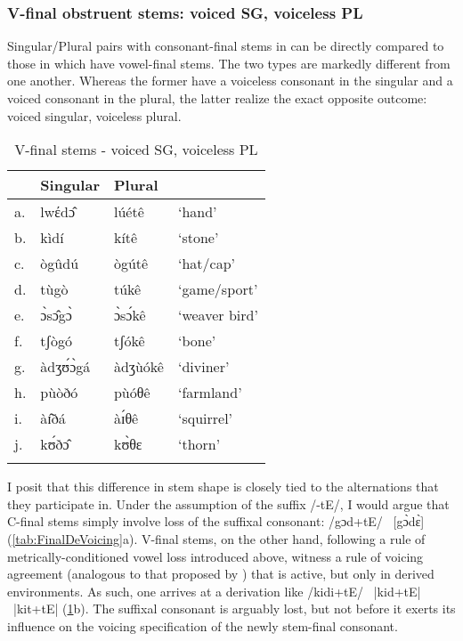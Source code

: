 \documentclass[output=paper,colorlinks,citecolor=brown]{langscibook}
\begin{document}
\subsubsection{V-final obstruent stems: voiced SG, voiceless PL}
\begin{sloppypar}
Singular/Plural pairs with consonant-final stems in  can be directly compared to those in  which have vowel-final stems. The two types are markedly different from one another. Whereas the former have a voiceless consonant in the singular and a voiced consonant in the plural, the latter realize the exact opposite outcome: voiced singular, voiceless plural.
\end{sloppypar}

\begin{table}
\caption{V-final stems - voiced SG, voiceless PL}
\label{tab:V-FinalDevoicing}
 \begin{tabular}{llll}
  \lsptoprule
& Singular & Plural &  \\
\midrule
a.	&lwέdɔ̂ &	lúétê	&`hand' \\
b.&	kìdí	&kítê&	`stone' \\
c.	&ògûdú&	ògútê	&`hat/cap' \\
d.&	tùgò&	túkê	&`game/sport' \\
e.&	ɔ̀sɔ̂gɔ̀&	ɔ̀sɔ́kê&	`weaver bird' \\
f.&	tʃògó	&tʃókê&`bone' \\
g.&	àdʒʊ́ɔ̀gá&	àdʒùókê&	`diviner' \\
h.	&pùòðó&	pùóθê	&`farmland' \\
i.	&àɪ̂ðá&	àɪ́θê&	`squirrel' \\
j.	&kʊ́ðɔ̂&	kʊ̀θɛ&	`thorn' \\
  \lspbottomrule
 \end{tabular}
 \end{table}
 
I posit that this difference in stem shape is closely tied to the alternations that they participate in. Under the assumption of the suffix /-tE/, I would argue that C-final stems simply involve loss of the suffixal consonant: /gɔd+tE/  \rightarrow\ [gɔ̀dɛ̀] (\ref{tab:FinalDeVoicing}a). V-final stems, on the other hand, following a rule of  metrically-conditioned vowel loss introduced above, witness a rule of voicing agreement (analogous to that proposed by \cite{Trommer2011}) that is active, but only in derived environments. As such, one arrives at a derivation like /kidi+tE/ \rightarrow\ |kid+tE| \rightarrow\ |kit+tE| \rightarrow [kítê] (\ref{tab:V-FinalDevoicing}b). The suffixal consonant is arguably lost, but not before it exerts its influence on the voicing specification of the newly stem-final consonant.
\end{document}
